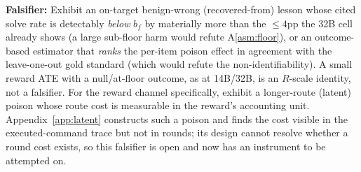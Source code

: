 \noindent\textbf{Falsifier:} Exhibit an on-target benign-wrong (recovered-from) lesson
whose cited solve rate is detectably \emph{below} $b_f$ by materially more than the
$\le4$pp the 32B cell already shows (a large sub-floor harm would refute A\ref{asm:floor}),
or an outcome-based estimator that \emph{ranks} the per-item poison effect in agreement
with the leave-one-out gold standard (which would refute the non-identifiability). A small
reward ATE with a null/at-floor outcome, as at 14B/32B, is an $R$-scale identity, not a
falsifier. For the reward channel specifically, exhibit a longer-route (latent) poison whose route
cost is measurable in the reward's accounting unit. Appendix~\ref{app:latent} constructs
such a poison and finds the cost visible in the executed-command trace but not in rounds;
its design cannot resolve whether a round cost exists, so this falsifier is open and now
has an instrument to be attempted on.
